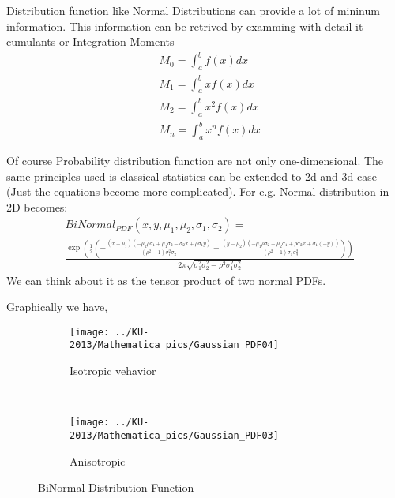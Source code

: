 \begin{frame}
 Distribution function like Normal Distributions can provide a lot of mininum information. This information can be retrived by examming with detail it cumulants or Integration Moments
 \begin{align*}
  & M_0 = \int_{a}^{b} f(x) dx \\
  & M_1 = \int_{a}^{b} x f(x) dx \\
  & M_2 = \int_{a}^{b} x^2 f(x) dx \\
  & M_n = \int_{a}^{b} x^n f(x) dx
 \end{align*}
\end{frame}

\begin{frame}
 Of course Probability distribution function are not only one-dimensional. The same principles used is classical statistics can be extended to 2d and 3d case (Just the equations become more complicated). 
 For e.g. Normal distribution in 2D becomes:
 \begin{align*}
  & BiNormal_{PDF}(x,y,\mu_1,\mu_2,\sigma_1,\sigma_2) = \\
  & \frac{\exp \left(\frac{1}{2} \left(-\frac{\left(x-\mu _1\right) \left(-\mu _2 \rho  \sigma _1+\mu _1 \sigma _2-\sigma _2 x+\rho  \sigma _1 y\right)}{\left(\rho ^2-1\right) \sigma _1^2 \sigma _2}-\frac{\left(y-\mu _2\right) \left(-\mu _1 \rho  \sigma _2+\mu _2 \sigma _1+\rho  \sigma _2 x+\sigma _1 (-y)\right)}{\left(\rho ^2-1\right) \sigma _1 \sigma _2^2}\right)\right)}{2 \pi  \sqrt{\sigma _1^2 \sigma _2^2-\rho ^2 \sigma _1^2 \sigma _2^2}}
 \end{align*}
We can think about it as the tensor product of two normal PDFs.
\end{frame}

\begin{frame}
  Graphically we have,
  \begin{figure}
        \centering
        \begin{subfigure}[b]{0.45\textwidth}
                \centering
                \texttt{[image: ../KU-2013/Mathematica\_pics/Gaussian\_PDF04]}
                \caption{Isotropic vehavior}
                \label{fig:Gaussian_PDF04}
        \end{subfigure}%
        ~ %
        \begin{subfigure}[b]{0.45\textwidth}
                \centering
                \texttt{[image: ../KU-2013/Mathematica\_pics/Gaussian\_PDF03]}
                \caption{Anisotropic}
                \label{fig:Gaussian_PDF03}
        \end{subfigure}
        \caption{BiNormal Distribution Function}
	\label{fig:BiNormalDistributionFunction}
 \end{figure}  
\end{frame}

